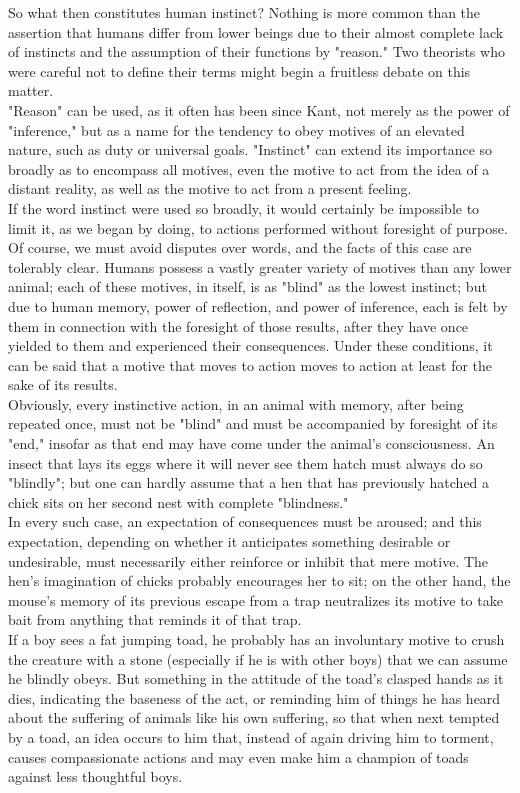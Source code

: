 \documentclass[12pt, oneside, openany]{book}
\begin{document}
So what then constitutes human instinct? Nothing is more common than the assertion that humans differ from lower beings due to their almost complete lack of instincts and the assumption of their functions by "reason." Two theorists who were careful not to define their terms might begin a fruitless debate on this matter.\\
"Reason" can be used, as it often has been since Kant, not merely as the power of "inference," but as a name for the tendency to obey motives of an elevated nature, such as duty or universal goals. "Instinct" can extend its importance so broadly as to encompass all motives, even the motive to act from the idea of a distant reality, as well as the motive to act from a present feeling.\\
If the word instinct were used so broadly, it would certainly be impossible to limit it, as we began by doing, to actions performed without foresight of purpose. Of course, we must avoid disputes over words, and the facts of this case are tolerably clear.
Humans possess a vastly greater variety of motives than any lower animal; each of these motives, in itself, is as "blind" as the lowest instinct; but due to human memory, power of reflection, and power of inference, each is felt by them in connection with the foresight of those results, after they have once yielded to them and experienced their consequences. Under these conditions, it can be said that a motive that moves to action moves to action at least for the sake of its results.\\
Obviously, every instinctive action, in an animal with memory, after being repeated once, must not be "blind" and must be accompanied by foresight of its "end," insofar as that end may have come under the animal's consciousness. An insect that lays its eggs where it will never see them hatch must always do so "blindly"; but one can hardly assume that a hen that has previously hatched a chick sits on her second nest with complete "blindness."\\
In every such case, an expectation of consequences must be aroused; and this expectation, depending on whether it anticipates something desirable or undesirable, must necessarily either reinforce or inhibit that mere motive. The hen's imagination of chicks probably encourages her to sit; on the other hand, the mouse's memory of its previous escape from a trap neutralizes its motive to take bait from anything that reminds it of that trap.\\
If a boy sees a fat jumping toad, he probably has an involuntary motive to crush the creature with a stone (especially if he is with other boys) that we can assume he blindly obeys. But something in the attitude of the toad's clasped hands as it dies, indicating the baseness of the act, or reminding him of things he has heard about the suffering of animals like his own suffering, so that when next tempted by a toad, an idea occurs to him that, instead of again driving him to torment, causes compassionate actions and may even make him a champion of toads against less thoughtful boys.\\
\end{document}
